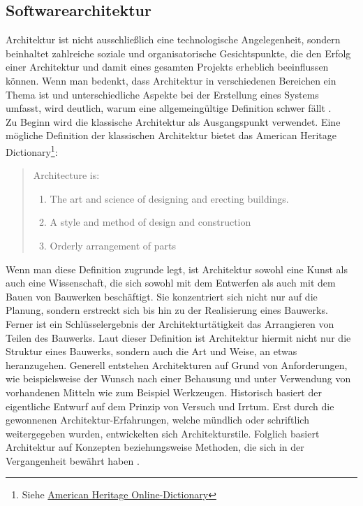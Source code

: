 
\subsection{Softwarearchitektur}
\label{sec:2_Softwarearchitektur}

Architektur ist nicht ausschließlich eine technologische Angelegenheit, sondern beinhaltet zahlreiche soziale und organisatorische Gesichtspunkte, die den Erfolg einer Architektur und damit eines gesamten Projekts erheblich beeinflussen können. Wenn man bedenkt, dass Architektur in verschiedenen Bereichen ein Thema ist und unterschiedliche Aspekte bei der Erstellung eines Systems umfasst, wird deutlich, warum eine allgemeingültige Definition schwer fällt \citereset \autocite{Vogel.2009}.\\
Zu Beginn wird die klassische Architektur als Ausgangspunkt verwendet. Eine mögliche Definition der klassischen Architektur bietet das \glqq American Heritage Dictionary\footnote{Siehe \href{http://ahdictionary.com/word/search.html?q=architecture&submit.x=39&submit.y=20}{American Heritage Online-Dictionary}}\grqq :
\begin{quote}
  Architecture is:
  \begin{enumerate}
    \item The art and science of designing and erecting buildings.
    \item A style and method of design and construction
    \item Orderly arrangement of parts
  \end{enumerate}
\end{quote}

Wenn man diese Definition zugrunde legt, ist Architektur sowohl eine Kunst als auch eine Wissenschaft, die sich sowohl mit dem Entwerfen als auch mit dem Bauen von Bauwerken beschäftigt. Sie konzentriert sich nicht nur auf die Planung, sondern erstreckt sich bis hin zu der Realisierung eines Bauwerks. Ferner ist ein Schlüsselergebnis der Architekturtätigkeit das Arrangieren von Teilen des Bauwerks. Laut dieser Definition ist Architektur hiermit nicht nur die Struktur eines Bauwerks, sondern auch die Art und Weise, an etwas heranzugehen. Generell entstehen Architekturen auf Grund von Anforderungen, wie beispielsweise der Wunsch nach einer Behausung und unter Verwendung von vorhandenen Mitteln wie zum Beispiel Werkzeugen. Historisch basiert der eigentliche Entwurf auf dem Prinzip von Versuch und Irrtum. Erst durch die gewonnenen Architektur-Erfahrungen, welche mündlich oder schriftlich weitergegeben wurden, entwickelten sich Architekturstile. Folglich basiert Architektur auf Konzepten beziehungsweise Methoden, die sich in der Vergangenheit bewährt haben \citereset \autocite{Vogel.2009}.\\

